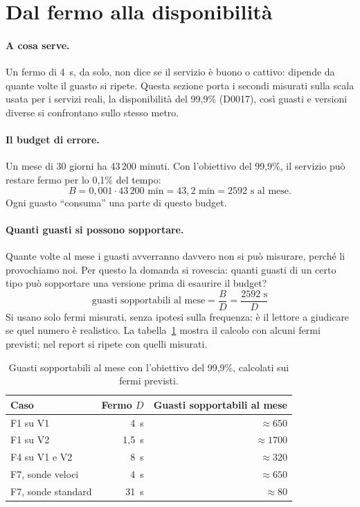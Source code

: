 \section{Dal fermo alla disponibilità}
\label{sec:disponibilita}

\paragraph{A cosa serve.} Un fermo di 4~s, da solo, non dice se il servizio è buono o cattivo: dipende da quante volte il guasto si ripete. Questa sezione porta i secondi misurati sulla scala usata per i servizi reali, la disponibilità del 99,9\% (D0017), così guasti e versioni diverse si confrontano sullo stesso metro.

\paragraph{Il budget di errore.} Un mese di 30 giorni ha 43\,200 minuti. Con l'obiettivo del 99,9\%, il servizio può restare fermo per lo 0,1\% del tempo:
\[
B = 0{,}001 \cdot 43\,200 \text{ min} = 43{,}2 \text{ min} = 2592 \text{ s al mese.}
\]
Ogni guasto ``consuma'' una parte di questo budget.

\paragraph{Quanti guasti si possono sopportare.} Quante volte al mese i guasti avverranno davvero non si può misurare, perché li provochiamo noi. Per questo la domanda si rovescia: quanti guasti di un certo tipo può sopportare una versione prima di esaurire il budget?
\[
\text{guasti sopportabili al mese} = \frac{B}{D} = \frac{2592 \text{ s}}{D}
\]
Si usano solo fermi misurati, senza ipotesi sulla frequenza: è il lettore a giudicare se quel numero è realistico. La tabella~\ref{tab:sopportabili} mostra il calcolo con alcuni fermi previsti; nel report si ripete con quelli misurati.

\begin{table}[htbp]
\centering
\caption{Guasti sopportabili al mese con l'obiettivo del 99,9\%, calcolati sui fermi previsti.}
\label{tab:sopportabili}
\begin{tabular}{@{}lrr@{}}
\toprule
\textbf{Caso} & \textbf{Fermo $D$} & \textbf{Guasti sopportabili al mese} \\
\midrule
F1 su V1 & 4~s & $\approx 650$ \\
F1 su V2 & 1,5~s & $\approx 1700$ \\
F4 su V1 e V2 & 8~s & $\approx 320$ \\
F7, sonde veloci & 4~s & $\approx 650$ \\
F7, sonde standard & 31~s & $\approx 80$ \\
\bottomrule
\end{tabular}
\end{table}


